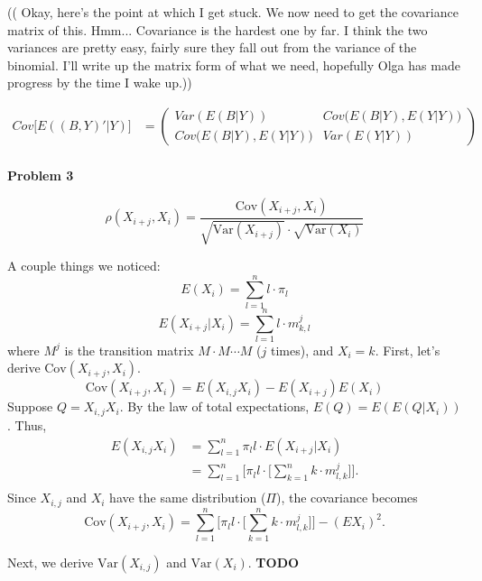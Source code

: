 \documentclass[12pt]{article}
\begin{document}
(( Okay, here's the point at which I get stuck. We now need to get the covariance matrix of this. Hmm... Covariance is the hardest one by far. I think the two variances are pretty easy, fairly sure they fall out from the variance of the binomial. I'll write up the matrix form of what we need, hopefully Olga has made progress by the time I wake up.))

\begin{equation*}
	\begin{aligned}
		Cov\big[E((B,Y)' | Y)\big] &=
		 \left(
		\begin{array}{cc}
			Var(E(B|Y)) & Cov\big(E(B|Y),E(Y|Y)\big)\\
			Cov\big(E(B|Y),E(Y|Y)\big) & Var(E(Y|Y))
		\end{array}
		\right) \\
	\end{aligned}
\end{equation*}




\pagebreak
\textbf{Problem 3} 

$$\rho(X_{i+j}, X_i) = \frac{\text{Cov}(X_{i+j}, X_i)}
                 {\sqrt{\text{Var}(X_{i+j})} \cdot \sqrt{\text{Var}(X_i)}} $$ 

A couple things we noticed: 
$$ E(X_i) = \sum_{l=1}^n{l\cdot\pi_l} $$ 
$$ E(X_{i+j} | X_i) = \sum_{l=1}^n{l \cdot m^j_{k,l}} $$
where $M^j$ is the transition matrix $M \cdot M \cdots M$ ($j$ times), and 
$X_i = k$. First, let's derive $\text{Cov}(X_{i+j}, X_i)$. 
$$ \text{Cov}(X_{i+j}, X_i) = E(X_{i,j}X_i) - E(X_{i+j})E(X_i) $$
Suppose $Q = X_{i,j}X_i$. By the law of total expectations, $ E(Q) = E(E(Q|X_i))$.
Thus, 
\begin{equation*}
  \begin{aligned}
    E(X_{i,j}X_i) &= \sum_{l=1}^n{ \pi_l l \cdot E(X_{i+j} | X_i)} \\
                  &= \sum_{l=1}^n{ \Bigg[ \pi_l l \cdot \Big[ 
                         \sum_{k=1}^n{k \cdot m^j_{l,k}} \Big]} \Bigg]. \\
  \end{aligned}
\end{equation*}
Since $X_{i,j}$ and $X_i$ have the same distribution ($\Pi$), the covariance becomes
$$ \text{Cov}(X_{i+j}, X_i) =  \sum_{l=1}^n{ \Bigg[ \pi_l l \cdot \Big[ 
                                     \sum_{k=1}^n{k \cdot m^j_{l,k}} \Big]} \Bigg]
                              - (EX_i)^2.$$

Next, we derive $\text{Var}(X_{i,j})$ and $\text{Var}(X_i)$. \textbf{TODO}
\end{document}
